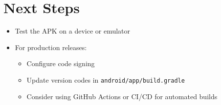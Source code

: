 \documentclass{article}
\begin{document}
\section{Next Steps}
\begin{itemize}
    \item Test the APK on a device or emulator
    \item For production releases:
    \begin{itemize}
        \item Configure code signing
        \item Update version codes in \texttt{android/app/build.gradle}
        \item Consider using GitHub Actions or CI/CD for automated builds
    \end{itemize}
\end{itemize}
\end{document}
